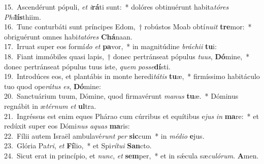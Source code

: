 {15.~}Ascendérunt pópuli, \textit{et} \textit{i}\textbf{rá}ti sunt:~* dolóres obtinuérunt habita\textit{tó}\textit{res} \textit{Phi}\textbf{lís}thiim.\\
{16.~}Tunc conturbáti sunt príncipes Edom,~† robústos Moab obtí\textit{nu}\textit{it} \textbf{tre}mor:~* obriguérunt omnes habi\textit{ta}\textit{tó}\textit{res} \textbf{Chá}naan.\\
{17.~}Irruat super eos formí\textit{do} \textit{et} \textbf{pa}vor,~* in magnitúdine \textit{brá}\textit{chi}\textit{i} \textbf{tu}i:\\
{18.~}Fiant immóbiles quasi lapis,~† donec pertránseat pópulus \textit{tu}\textit{us}, \textbf{Dó}mine,~* donec pertránseat pópulus tuus iste, \textit{quem} \textit{pos}\textit{se}\textbf{dí}sti.\\
{19.~}Introdúces eos, et plantábis in monte heredi\textit{tá}\textit{tis} \textbf{tu}æ,~* firmíssimo habitáculo tuo quod ope\textit{rá}\textit{tus} \textit{es}, \textbf{Dó}mine:\\
{20.~}Sanctuárium tuum, Dómine, quod firmavérunt \textit{ma}\textit{nus} \textbf{tu}æ.~* Dóminus regnábit in æ\textit{tér}\textit{num} \textit{et} \textbf{ul}tra.\\
{21.~}Ingréssus est enim eques Phárao cum cúrribus et equítibus e\textit{jus} \textit{in} \textbf{ma}re:~* et redúxit super eos Dómi\textit{nus} \textit{a}\textit{quas} \textbf{ma}ris:\\
{22.~}Fílii autem Israël ambulavé\textit{runt} \textit{per} \textbf{sic}cum~* in \textit{mé}\textit{di}\textit{o} \textbf{e}jus.\\
{23.~}Glória Pa\textit{tri}, \textit{et} \textbf{Fí}lio,~* et Spi\textit{rí}\textit{tu}\textit{i} \textbf{San}cto.\\
{24.~}Sicut erat in princípio, et \textit{nunc}, \textit{et} \textbf{sem}per,~* et in sǽcula sæ\textit{cu}\textit{ló}\textit{rum}. \textbf{A}men.\\

